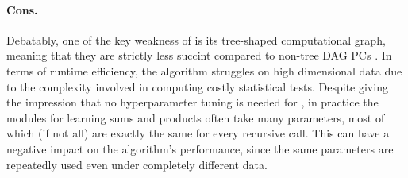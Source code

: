 \paragraph{Cons.} Debatably, one of the key weakness of  is its tree-shaped
computational graph, meaning that they are strictly less succint compared to non-tree DAG PCs
\citep{martens14}. In terms of runtime efficiency, the algorithm struggles on high dimensional
data due to the complexity involved in computing costly statistical tests. Despite
 giving the impression that no hyperparameter tuning is needed for
, in practice the modules for learning sums and products often take many
parameters, most of which (if not all) are exactly the same for every recursive call. This can have
a negative impact on the algorithm's performance, since the same parameters are repeatedly used
even under completely different data.


